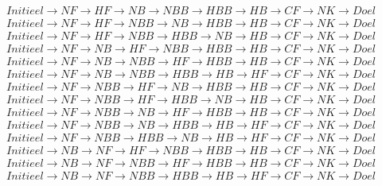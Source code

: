 \documentclass{article}
\begin{document}
\[
\begin{array}{c}
Initieel \rightarrow NF \rightarrow HF \rightarrow NB \rightarrow NBB \rightarrow HBB \rightarrow HB \rightarrow CF \rightarrow NK \rightarrow Doel\\
Initieel \rightarrow NF \rightarrow HF \rightarrow NBB \rightarrow NB \rightarrow HBB \rightarrow HB \rightarrow CF \rightarrow NK \rightarrow Doel\\
Initieel \rightarrow NF \rightarrow HF \rightarrow NBB \rightarrow HBB \rightarrow NB \rightarrow HB \rightarrow CF \rightarrow NK \rightarrow Doel\\
Initieel \rightarrow NF \rightarrow NB \rightarrow HF \rightarrow NBB \rightarrow HBB \rightarrow HB \rightarrow CF \rightarrow NK \rightarrow Doel\\
Initieel \rightarrow NF \rightarrow NB \rightarrow NBB \rightarrow HF \rightarrow HBB \rightarrow HB \rightarrow CF \rightarrow NK \rightarrow Doel\\
Initieel \rightarrow NF \rightarrow NB \rightarrow NBB \rightarrow HBB \rightarrow HB \rightarrow HF \rightarrow CF \rightarrow NK \rightarrow Doel\\
Initieel \rightarrow NF \rightarrow NBB \rightarrow HF \rightarrow NB \rightarrow HBB \rightarrow HB \rightarrow CF \rightarrow NK \rightarrow Doel\\
Initieel \rightarrow NF \rightarrow NBB \rightarrow HF \rightarrow HBB \rightarrow NB \rightarrow HB \rightarrow CF \rightarrow NK \rightarrow Doel\\
Initieel \rightarrow NF \rightarrow NBB \rightarrow NB \rightarrow HF \rightarrow HBB \rightarrow HB \rightarrow CF \rightarrow NK \rightarrow Doel\\
Initieel \rightarrow NF \rightarrow NBB \rightarrow NB \rightarrow HBB \rightarrow HB \rightarrow HF \rightarrow CF \rightarrow NK \rightarrow Doel\\
Initieel \rightarrow NF \rightarrow NBB \rightarrow HBB \rightarrow NB \rightarrow HB \rightarrow HF \rightarrow CF \rightarrow NK \rightarrow Doel\\
Initieel \rightarrow NB \rightarrow NF \rightarrow HF \rightarrow NBB \rightarrow HBB \rightarrow HB \rightarrow CF \rightarrow NK \rightarrow Doel\\
Initieel \rightarrow NB \rightarrow NF \rightarrow NBB \rightarrow HF \rightarrow HBB \rightarrow HB \rightarrow CF \rightarrow NK \rightarrow Doel\\
Initieel \rightarrow NB \rightarrow NF \rightarrow NBB \rightarrow HBB \rightarrow HB \rightarrow HF \rightarrow CF \rightarrow NK \rightarrow Doel\\

\end{array}\]
\end{document}
